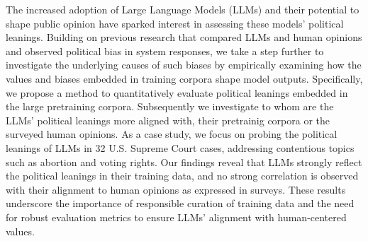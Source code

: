 The increased adoption of Large Language Models (LLMs) and their potential to shape public opinion have sparked interest in assessing these models' political leanings. Building on previous research that compared LLMs and human opinions and observed political bias in system responses, we take a step further to investigate the underlying causes of such biases by empirically examining how the values and biases embedded in training corpora shape model outputs.
Specifically, we propose a method to quantitatively evaluate political leanings embedded in the large pretraining corpora. Subsequently we investigate to whom are the LLMs' political leanings more aligned with, their pretrainig corpora or the surveyed human opinions. As a case study, we focus on probing the political leanings of LLMs in 32 U.S. Supreme Court cases, addressing contentious topics such as abortion and voting rights. Our findings reveal that LLMs strongly reflect the political leanings in their training data, and no strong correlation is observed with their alignment to human opinions as expressed in surveys.
These results underscore the importance of responsible curation of training data and the need for robust evaluation metrics to ensure LLMs' alignment with human-centered values.




